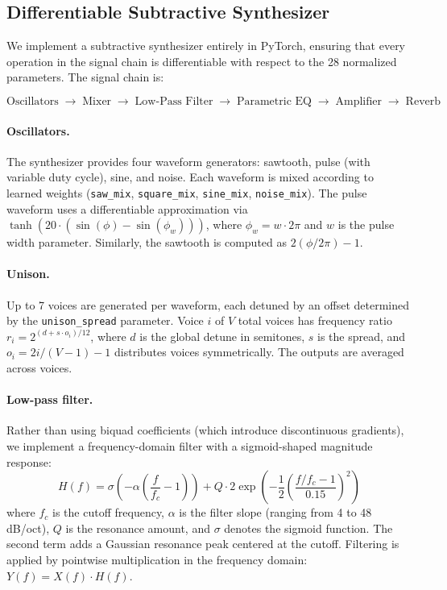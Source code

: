 \subsection{Differentiable Subtractive Synthesizer}
\label{sec:synth}

We implement a subtractive synthesizer entirely in PyTorch, ensuring that every operation in the signal chain is differentiable with respect to the 28 normalized parameters. The signal chain is:

\[
\text{Oscillators} \;\rightarrow\; \text{Mixer} \;\rightarrow\; \text{Low-Pass Filter} \;\rightarrow\; \text{Parametric EQ} \;\rightarrow\; \text{Amplifier} \;\rightarrow\; \text{Reverb}
\]

\paragraph{Oscillators.} The synthesizer provides four waveform generators: sawtooth, pulse (with variable duty cycle), sine, and noise. Each waveform is mixed according to learned weights (\texttt{saw\_mix}, \texttt{square\_mix}, \texttt{sine\_mix}, \texttt{noise\_mix}). The pulse waveform uses a differentiable approximation via $\tanh(20 \cdot (\sin(\phi) - \sin(\phi_w)))$, where $\phi_w = w \cdot 2\pi$ and $w$ is the pulse width parameter. Similarly, the sawtooth is computed as $2(\phi / 2\pi) - 1$.

\paragraph{Unison.} Up to 7 voices are generated per waveform, each detuned by an offset determined by the \texttt{unison\_spread} parameter. Voice $i$ of $V$ total voices has frequency ratio $r_i = 2^{(d + s \cdot o_i)/12}$, where $d$ is the global detune in semitones, $s$ is the spread, and $o_i = 2i/(V-1) - 1$ distributes voices symmetrically. The outputs are averaged across voices.

\paragraph{Low-pass filter.} Rather than using biquad coefficients (which introduce discontinuous gradients), we implement a frequency-domain filter with a sigmoid-shaped magnitude response:
\begin{equation}
    H(f) = \sigma\!\left(-\alpha \left(\frac{f}{f_c} - 1\right)\right) + Q \cdot 2 \exp\!\left(-\frac{1}{2}\left(\frac{f/f_c - 1}{0.15}\right)^{\!2}\right)
    \label{eq:filter}
\end{equation}
where $f_c$ is the cutoff frequency, $\alpha$ is the filter slope (ranging from 4 to 48\,dB/oct), $Q$ is the resonance amount, and $\sigma$ denotes the sigmoid function. The second term adds a Gaussian resonance peak centered at the cutoff. Filtering is applied by pointwise multiplication in the frequency domain: $Y(f) = X(f) \cdot H(f)$.

